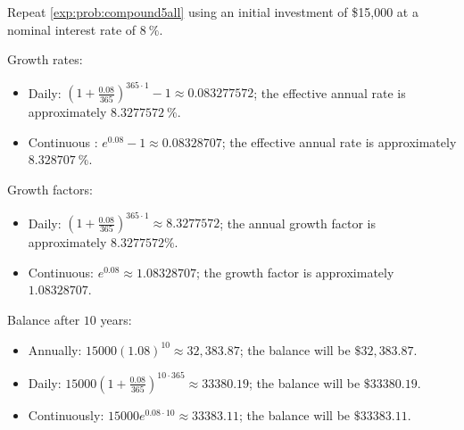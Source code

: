 \begin{doyouunderstand}
	\begin{problem}
	Repeat \cref{exp:prob:compound5all} using an initial investment of \$15,000 at a nominal interest rate of $\SI{8}{\percent}$.
	\begin{shortsolution}
		Growth rates:
		\begin{itemize}
			\item Daily: $\left(1+\frac{0.08}{365}\right)^{365\cdot 1} -1 \approx 0.083277572$; the effective annual rate is approximately $\SI{8.3277572}{\percent}$.
			\item Continuous : $e^{0.08}-1\approx 0.08328707$; the effective annual rate is approximately $\SI{8.328707}{\percent}$.
		\end{itemize}
		Growth factors:
		\begin{itemize}
			\item Daily: $\left(1+\frac{0.08}{365}\right)^{365\cdot 1} \approx 8.3277572$; the annual growth factor is approximately $8.3277572\%$.
			\item Continuous: $e^{0.08} \approx 1.08328707$; the growth factor is approximately $1.08328707$.
		\end{itemize}
		Balance after $10$ years:
		\begin{itemize}
			\item Annually: $15000(1.08)^{10} \approx 32,383.87$; the balance will be $\$32,383.87$.
			\item Daily: $15000\left(1+\frac{0.08}{365}\right)^{10\cdot 365} \approx 33380.19$; the balance will be $\$33380.19$.
			\item Continuously: $15000e^{0.08\cdot 10} \approx 33383.11$; the balance will be $\$33383.11$.
		\end{itemize}
	\end{shortsolution}
	\end{problem}
\end{doyouunderstand}
			
